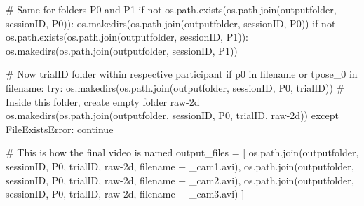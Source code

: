 \documentclass[
  letterpaper,
  DIV=11,
  numbers=noendperiod]{scrreprt}
\newenvironment{Shaded}{\begin{snugshade}}{\end{snugshade}}
\newcommand{\CommentTok}[1]{\textcolor[rgb]{0.37,0.37,0.37}{#1}}
\newcommand{\ControlFlowTok}[1]{\textcolor[rgb]{0.00,0.23,0.31}{#1}}
\newcommand{\KeywordTok}[1]{\textcolor[rgb]{0.00,0.23,0.31}{#1}}
\newcommand{\NormalTok}[1]{\textcolor[rgb]{0.00,0.23,0.31}{#1}}
\newcommand{\OperatorTok}[1]{\textcolor[rgb]{0.37,0.37,0.37}{#1}}
\newcommand{\PreprocessorTok}[1]{\textcolor[rgb]{0.68,0.00,0.00}{#1}}
\newcommand{\StringTok}[1]{\textcolor[rgb]{0.13,0.47,0.30}{#1}}
\begin{document}
\begin{Shaded}
\begin{Highlighting}[]
    \CommentTok{\# Same for folders P0 and P1}
    \ControlFlowTok{if} \KeywordTok{not}\NormalTok{ os.path.exists(os.path.join(outputfolder, sessionID, }\StringTok{\textquotesingle{}P0\textquotesingle{}}\NormalTok{)):}
\NormalTok{        os.makedirs(os.path.join(outputfolder, sessionID, }\StringTok{\textquotesingle{}P0\textquotesingle{}}\NormalTok{))}
    \ControlFlowTok{if} \KeywordTok{not}\NormalTok{ os.path.exists(os.path.join(outputfolder, sessionID, }\StringTok{\textquotesingle{}P1\textquotesingle{}}\NormalTok{)):}
\NormalTok{        os.makedirs(os.path.join(outputfolder, sessionID, }\StringTok{\textquotesingle{}P1\textquotesingle{}}\NormalTok{))}

    \CommentTok{\# Now trialID folder within respective participant}
    \ControlFlowTok{if} \StringTok{\textquotesingle{}p0\textquotesingle{}} \KeywordTok{in}\NormalTok{ filename }\KeywordTok{or} \StringTok{\textquotesingle{}tpose\_0\textquotesingle{}} \KeywordTok{in}\NormalTok{ filename:}
        \ControlFlowTok{try}\NormalTok{:}
\NormalTok{            os.makedirs(os.path.join(outputfolder, sessionID, }\StringTok{\textquotesingle{}P0\textquotesingle{}}\NormalTok{, trialID))}
            \CommentTok{\# Inside this folder, create empty folder \textquotesingle{}raw{-}2d\textquotesingle{}}
\NormalTok{            os.makedirs(os.path.join(outputfolder, sessionID, }\StringTok{\textquotesingle{}P0\textquotesingle{}}\NormalTok{, trialID, }\StringTok{\textquotesingle{}raw{-}2d\textquotesingle{}}\NormalTok{))}
        \ControlFlowTok{except} \PreprocessorTok{FileExistsError}\NormalTok{:}
            \ControlFlowTok{continue}

        \CommentTok{\# This is how the final video is named}
\NormalTok{        output\_files }\OperatorTok{=}\NormalTok{ [}
\NormalTok{            os.path.join(outputfolder, sessionID, }\StringTok{\textquotesingle{}P0\textquotesingle{}}\NormalTok{, trialID, }\StringTok{\textquotesingle{}raw{-}2d\textquotesingle{}}\NormalTok{, filename }\OperatorTok{+} \StringTok{\textquotesingle{}\_cam1.avi\textquotesingle{}}\NormalTok{),}
\NormalTok{            os.path.join(outputfolder, sessionID, }\StringTok{\textquotesingle{}P0\textquotesingle{}}\NormalTok{, trialID, }\StringTok{\textquotesingle{}raw{-}2d\textquotesingle{}}\NormalTok{, filename }\OperatorTok{+} \StringTok{\textquotesingle{}\_cam2.avi\textquotesingle{}}\NormalTok{),}
\NormalTok{            os.path.join(outputfolder, sessionID, }\StringTok{\textquotesingle{}P0\textquotesingle{}}\NormalTok{, trialID, }\StringTok{\textquotesingle{}raw{-}2d\textquotesingle{}}\NormalTok{, filename }\OperatorTok{+} \StringTok{\textquotesingle{}\_cam3.avi\textquotesingle{}}\NormalTok{)}
\NormalTok{        ]}


\end{Highlighting}
\end{Shaded}
\end{document}
